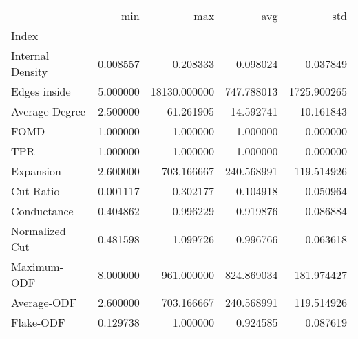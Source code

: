 \begin{tabular}{lrrrr}
\toprule
{} &       min &           max &         avg &          std \\
Index            &           &               &             &              \\
\midrule
Internal Density &  0.008557 &      0.208333 &    0.098024 &     0.037849 \\
Edges inside     &  5.000000 &  18130.000000 &  747.788013 &  1725.900265 \\
Average Degree   &  2.500000 &     61.261905 &   14.592741 &    10.161843 \\
FOMD             &  1.000000 &      1.000000 &    1.000000 &     0.000000 \\
TPR              &  1.000000 &      1.000000 &    1.000000 &     0.000000 \\
Expansion        &  2.600000 &    703.166667 &  240.568991 &   119.514926 \\
Cut Ratio        &  0.001117 &      0.302177 &    0.104918 &     0.050964 \\
Conductance      &  0.404862 &      0.996229 &    0.919876 &     0.086884 \\
Normalized Cut   &  0.481598 &      1.099726 &    0.996766 &     0.063618 \\
Maximum-ODF      &  8.000000 &    961.000000 &  824.869034 &   181.974427 \\
Average-ODF      &  2.600000 &    703.166667 &  240.568991 &   119.514926 \\
Flake-ODF        &  0.129738 &      1.000000 &    0.924585 &     0.087619 \\
\bottomrule
\end{tabular}
